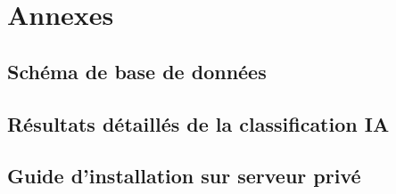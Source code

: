 
\chapter{Annexes}

\section{Schéma de base de données}
\label{annexe:schema_bdd}


\section{Résultats détaillés de la classification IA}
\label{annexe:resultats_ia}


\section{Guide d'installation sur serveur privé}
\label{annexe:guide_installation}

